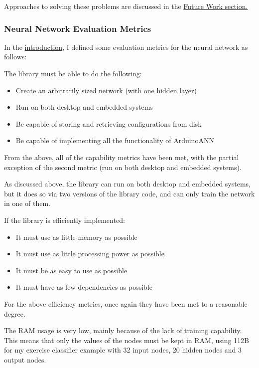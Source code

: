 \documentclass[a4paper]{article}
\begin{document}
Approaches to solving these problems are discussed in the \hyperref[subsec:fw_futurework]{Future Work section.}

\newpage
\subsubsection{Neural Network Evaluation Metrics}

In the \hyperref[subsubsec:in_cs_nnmetrics]{introduction}, I defined some evaluation metrics for the neural network as follows:

The library must be able to do the following:

\begin{itemize}
\item Create an arbitrarily sized network (with one hidden layer)
\item Run on both desktop and embedded systems
\item Be capable of storing and retrieving configurations from disk
\item Be capable of implementing all the functionality of ArduinoANN
\end{itemize}

From the above, all of the capability metrics have been met, with the partial exception of the second metric (run on both desktop and embedded systems).

As discussed above, the library can run on both desktop and embedded systems, but it does so via two versions of the library code, and can only train the network in one of them.

If the library is efficiently implemented:

\begin{itemize}
\item It must use as little memory as possible
\item It must use as little processing power as possible
\item It must be as easy to use as possible
\item It must have as few dependencies as possible
\end{itemize}

For the above efficiency metrics, once again they have been met to a reasonable degree. 

The RAM usage is very low, mainly because of the lack of training capability. This means that only the values of the nodes must be kept in RAM, using 112B for my exercise classifier example with 32 input nodes, 20 hidden nodes and 3 output nodes.
\end{document}
